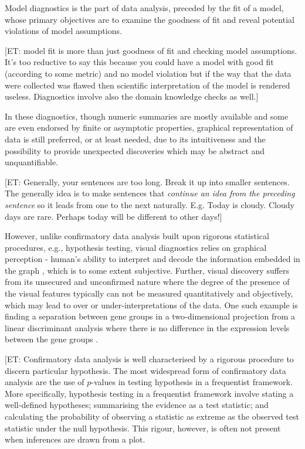 \documentclass{monashthesis}
\begin{document}
Model diagnostics is the part of data analysis, preceded by the fit of a model, whose primary objectives are to examine the goodness of fit and reveal potential violations of model assumptions.

{[}ET: model fit is more than just goodness of fit and checking model assumptions. It's too reductive to say this because you could have a model with good fit (according to some metric) and no model violation but if the way that the data were collected was flawed then scientific interpretation of the model is rendered useless. Diagnostics involve also the domain knowledge checks as well.{]}

In these diagnostics, though numeric summaries are mostly available and some are even endorsed by finite or asymptotic properties, graphical representation of data is still preferred, or at least needed, due to its intuitiveness and the possibility to provide unexpected discoveries which may be abstract and
unquantifiable.

{[}ET: Generally, your sentences are too long. Break it up into smaller sentences. The generally idea is to make sentences that \emph{continue an idea from the preceding sentence} so it leads from one to the next naturally. E.g. Today is cloudy. Cloudy days are rare. Perhaps today will be different to other days!{]}

However, unlike confirmatory data analysis built upon rigorous statistical procedures, e.g., hypothesis testing, visual diagnostics relies on graphical perception - human's ability to interpret and decode the information embedded in the graph \autocite{cleveland_graphical_1984}, which is to some extent subjective. Further, visual discovery suffers from its unsecured and unconfirmed nature where the degree of the presence of the visual features typically can not be measured quantitatively and objectively, which may lead to over or under-interpretations of the data. One such example is finding a separation between gene groups in a two-dimensional projection from a linear discriminant analysis where there is no difference in the expression levels between the gene groups \autocite{roy_chowdhury_using_2015}.

{[}ET: Confirmatory data analysis is well characterised by a rigorous procedure to discern particular hypothesis. The most widespread form of confirmatory data analysis are the use of \(p\)-values in testing hypothesis in a frequentist framework. More specifically, hypothesis testing in a frequentist framework involve stating a well-defined hypotheses; summarising the evidence as a test statistic; and calculating the probability of observing a statistic as extreme as the observed test statistic under the null hypothesis. This rigour, however, is often not present when inferences are drawn from a plot.
\end{document}
